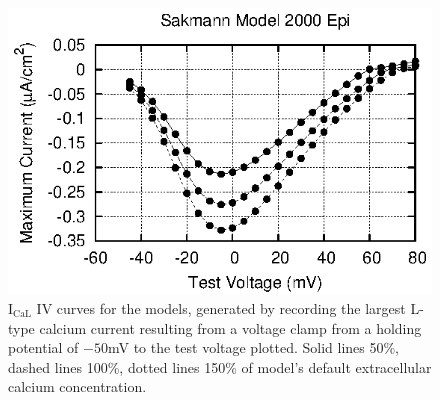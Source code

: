\documentclass[preprint,authoryear,12pt]{elsarticle}
\begin{document}
\begin{figure}
\begin{center}
\includegraphics[width=0.32\linewidth]{sakmann_model_2000_epi_ICaL_IV_curve}
\caption{I$_\textrm{CaL}$ IV curves for the models, generated by recording the largest L-type calcium current resulting from a voltage clamp from a holding potential of $-50$mV to the test voltage plotted. Solid lines 50\%, dashed lines 100\%, dotted lines 150\% of model's default extracellular calcium concentration.}
\label{fig:ICaL_IV_curves:rest2}
\end{center}
\end{figure}
\end{document}
